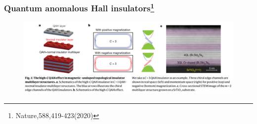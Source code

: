 \documentclass{beamer}
\begin{document}
\begin{frame}
\frametitle{Quantum anomalous Hall insulators\footnote{Nature,588,419-423(2020)}}
\begin{figure}
\centering
\includegraphics[scale=0.5]{pic/p19.png}
\end{figure}
\end{frame}
\end{document}
